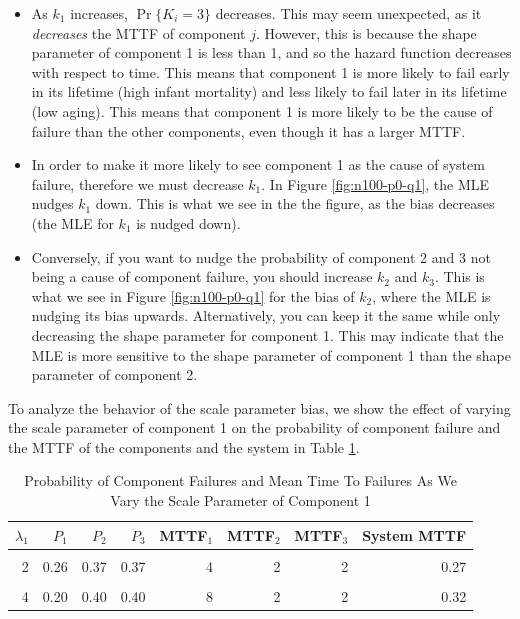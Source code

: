 \documentclass[
]{article}
\begin{document}
\begin{itemize}
\item
  As \(k_1\) increases, \(\Pr\{K_i = 3\}\) decreases. This may seem
  unexpected, as it \emph{decreases} the MTTF of component \(j\).
  However, this is because the shape parameter of component 1 is less
  than 1, and so the hazard function decreases with respect to time.
  This means that component 1 is more likely to fail early in its
  lifetime (high infant mortality) and less likely to fail later in its
  lifetime (low aging). This means that component 1 is more likely to be
  the cause of failure than the other components, even though it has a
  larger MTTF.
\item
  In order to make it more likely to see component 1 as the cause of
  system failure, therefore we must decrease \(k_1\). In Figure
  \ref{fig:n100-p0-q1}, the MLE nudges \(k_1\) down. This is what we see
  in the the figure, as the bias decreases (the MLE for \(k_1\) is
  nudged down).
\item
  Conversely, if you want to nudge the probability of component 2 and 3
  not being a cause of component failure, you should increase \(k_2\)
  and \(k_3\). This is what we see in Figure \ref{fig:n100-p0-q1} for
  the bias of \(k_2\), where the MLE is nudging its bias upwards.
  Alternatively, you can keep it the same while only decreasing the
  shape parameter for component 1. This may indicate that the MLE is
  more sensitive to the shape parameter of component 1 than the shape
  parameter of component 2.
\end{itemize}

To analyze the behavior of the scale parameter bias, we show the effect
of varying the scale parameter of component 1 on the probability of
component failure and the MTTF of the components and the system in Table
\ref{tab:table-vary-lam1}.

\begin{table}

\caption{\label{tab:table-vary-lam1}Probability of Component Failures and Mean Time To Failures As We Vary the Scale Parameter of Component 1}
\centering
\begin{tabular}[t]{r|r|r|r|r|r|r|r}
\hline
$\lambda_1$ & $P_1$ & $P_2$ & $P_3$ & MTTF$_1$ & MTTF$_2$ & MTTF$_3$ & System MTTF\\
\hline
\cellcolor{gray!6}{1} & \cellcolor{gray!6}{0.33} & \cellcolor{gray!6}{0.33} & \cellcolor{gray!6}{0.33} & \cellcolor{gray!6}{2} & \cellcolor{gray!6}{2} & \cellcolor{gray!6}{2} & \cellcolor{gray!6}{0.22}\\
\hline
2 & 0.26 & 0.37 & 0.37 & 4 & 2 & 2 & 0.27\\
\hline
\cellcolor{gray!6}{3} & \cellcolor{gray!6}{0.22} & \cellcolor{gray!6}{0.39} & \cellcolor{gray!6}{0.39} & \cellcolor{gray!6}{6} & \cellcolor{gray!6}{2} & \cellcolor{gray!6}{2} & \cellcolor{gray!6}{0.30}\\
\hline
4 & 0.20 & 0.40 & 0.40 & 8 & 2 & 2 & 0.32\\
\hline
\end{tabular}
\end{table}
\end{document}
